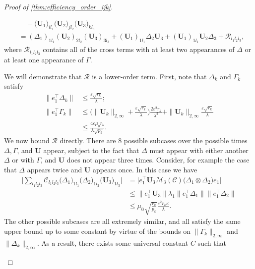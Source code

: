 \documentclass[10pt]{article}
\newcommand{\0}{{\mathbf{0}}}
\newcommand{\1}{{\mathbf{1}}}
\newcommand{\I}{{\mathbf{I}}}
\newcommand{\U}{{\mathbf{U}}}
\renewcommand{\t}{^{\top}}
\newcommand{\eps}{\varepsilon}
\begin{document}
\begin{proof}[Proof of \cref{thm:efficiency_order_ijk}]
\begin{itemize}
\begin{align*}
  &\quad -  \big(\U_1\big)_{il_1} \big(\U_2\big)_{jl_2} \big(\U_3\big)_{kl_3} \\
  &= (\Delta_1)_{1l_1} (\U_2)_{2l_2} (\U_3)_{3l_3} + (\U_1)_{1l_1}  \Delta_2  \U_3 + (\U_1)_{1l_1} \U_2 \Delta_3 + \mathcal{R}_{l_1l_2l_3},
\end{align*}
where $\mathcal{R}_{l_1l_2l_3}$ contains all of the cross terms with at least two appearances of $\Delta$ or at least one appearance of $\Gamma$.  

We will demonstrate that $\mathcal{R}$ is a lower-order term. First, note that $\Delta_k$ and $\Gamma_k$ satisfy
\begin{align*}
    \| e_1\t \Delta_k \| &\leq \frac{\eps \sqrt{r_k}}{\lambda}; \\
    \|e_1\t \Gamma_k \| &\leq \bigg( \| \U_k \|_{2,\infty} + \frac{\eps \sqrt{r_k}}{\lambda} \bigg) \frac{2 \eps^2 r_k}{\lambda^2} + \| \U_k \|_{2,\infty} \frac{\eps \sqrt{r_k}}{\lambda} \\
    &\leq \frac{4 \eps \mu_0 r_k}{\lambda \sqrt{p_k}}. 
\end{align*}
We now bound $\mathcal{R}$ directly.  There are 8 possible subcases over the possible times $\Delta,\Gamma$, and $\U$ appear, subject to the fact that $\Delta$ must appear with either another $\Delta$ or with $\Gamma$, and $\U$ does not appear three times. Consider, for example the case that $\Delta$ appears twice and $\U$ appears once.  In this case we have
    \begin{align*}
        \bigg| \sum_{l_1l_2l_3} \mathcal{C}_{l_1l_2l_3} \big( \Delta_{1} \big)_{1l_1} \big( \Delta_2 \big)_{1l_2} \big( \U_3 \big)_{1l_3} \bigg| &= \bigg| e_1 \t \U_3 \mathcal{M}_3(\mathcal{C}) \big( \Delta_1 \otimes \Delta_2 \big) e_1 \bigg| \\
        &\leq \| e_1\t \U_3 \| \lambda_1 \| e_1\t \Delta_1 \| \| e_1\t \Delta_2 \| \\
        &\leq \mu_0 \sqrt{\frac{r_k}{p_k}} \frac{\eps^2 r_k \kappa }{\lambda}.
    \end{align*}
The other possible subcases are all extremely similar, and all satisfy the same upper bound up to some constant by virtue of the bounds on $\|\Gamma_k\|_{2,\infty}$ and $\|\Delta_k\|_{2,\infty}$.  As a result, there exists some universal constant $C$ such that

\end{itemize}
\end{proof}
\end{document}
